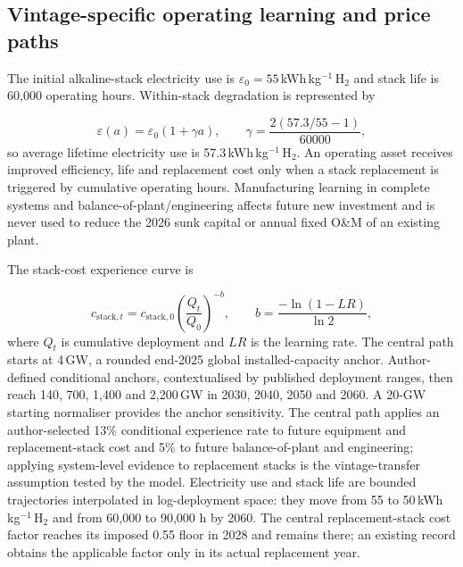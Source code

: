 \documentclass[pdflatex,sn-nature]{sn-jnl}
\begin{document}
\subsection*{Vintage-specific operating learning and price paths}

The initial alkaline-stack electricity use is $\varepsilon_0=55$\,kWh\,kg$^{-1}$\,H$_2$ and stack life is 60,000 operating hours. Within-stack degradation is represented by

\begin{equation}
\varepsilon(a)=\varepsilon_0(1+\gamma a), \qquad
\gamma=\frac{2(57.3/55-1)}{60000},
\label{eq:degradation}
\end{equation}
so average lifetime electricity use is 57.3\,kWh\,kg$^{-1}$\,H$_2$. An operating asset receives improved efficiency, life and replacement cost only when a stack replacement is triggered by cumulative operating hours. Manufacturing learning in complete systems and balance-of-plant/engineering affects future new investment and is never used to reduce the 2026 sunk capital or annual fixed O\&M of an existing plant.

The stack-cost experience curve is

\begin{equation}
c_{\mathrm{stack},t}=c_{\mathrm{stack},0}
\left(\frac{Q_t}{Q_0}\right)^{-b}, \qquad
b=\frac{-\ln(1-LR)}{\ln 2},
\label{eq:learning}
\end{equation}
where $Q_t$ is cumulative deployment and $LR$ is the learning rate. The central path starts at 4\,GW, a rounded end-2025 global installed-capacity anchor\cite{iea2025}. Author-defined conditional anchors, contextualised by published deployment ranges, then reach 140, 700, 1,400 and 2,200\,GW in 2030, 2040, 2050 and 2060. A 20-GW starting normaliser provides the anchor sensitivity. The central path applies an author-selected 13\% conditional experience rate to future equipment and replacement-stack cost and 5\% to future balance-of-plant and engineering; applying system-level evidence to replacement stacks is the vintage-transfer assumption tested by the model. Electricity use and stack life are bounded trajectories interpolated in log-deployment space: they move from 55 to 50\,kWh\,kg$^{-1}$\,H$_2$ and from 60,000 to 90,000 h by 2060\cite{glenk2023,doe2024,worldbank2026,iea2025}. The central replacement-stack cost factor reaches its imposed 0.55 floor in 2028 and remains there; an existing record obtains the applicable factor only in its actual replacement year.
\end{document}
